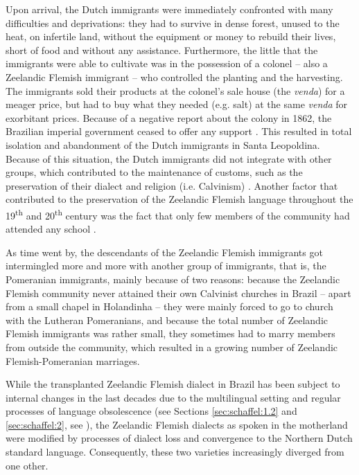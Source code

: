 \documentclass[output=paper,hidelinks,draftmode]{langscibook}
\begin{document}
Upon arrival, the Dutch immigrants were immediately confronted with many difficulties and deprivations: they had to survive in dense forest, unused to the heat, on infertile land, without the equipment or money to rebuild their lives, short of food and without any assistance. Furthermore, the little that the immigrants were able to cultivate was in the possession of a colonel – also a Zeelandic Flemish immigrant – who controlled the planting and the harvesting. The immigrants sold their products at the colonel’s sale house (the \textit{venda}) for a meager price, but had to buy what they needed (e.g. salt) at the same \textit{venda} for exorbitant prices. Because of a negative report about the colony in 1862, the Brazilian imperial government ceased to offer any support \citep{Tschudi2004}. This resulted in total isolation and abandonment of the Dutch immigrants in Santa Leopoldina. Because of this situation, the Dutch immigrants did not integrate with other groups, which contributed to the maintenance of customs, such as the preservation of their dialect and religion (i.e. Calvinism) \citep{Buysse1984, RoosEshuis2008}. Another factor that contributed to the preservation of the Zeelandic Flemish language throughout the 19\textsuperscript{th} and 20\textsuperscript{th} century was the fact that only few members of the community had attended any school \citep[69]{Schaffel2010}. 

As time went by, the descendants of the Zeelandic Flemish immigrants got intermingled more and more with another group of immigrants, that is, the Pomeranian immigrants, mainly because of two reasons: because the Zeelandic Flemish community never attained their own Calvinist churches in Brazil – apart from a small chapel in Holandinha – they were mainly forced to go to church with the Lutheran Pomeranians, and because the total number of Zeelandic Flemish immigrants was rather small, they sometimes had to marry members from outside the community, which resulted in a growing number of Zeelandic Flemish-Pomeranian marriages.

While the transplanted Zeelandic Flemish dialect in Brazil has been subject to internal changes in the last decades due to the multilingual setting and regular processes of language obsolescence (see Sections \ref{sec:schaffel:1.2} and \ref{sec:schaffel:2}, see \citealt{SchaffelBremenkampPostma2017}), the Zeelandic Flemish dialects as spoken in the motherland were modified by processes of dialect loss and convergence to the Northern Dutch standard language. Consequently, these two varieties increasingly diverged from one other.
\end{document}
